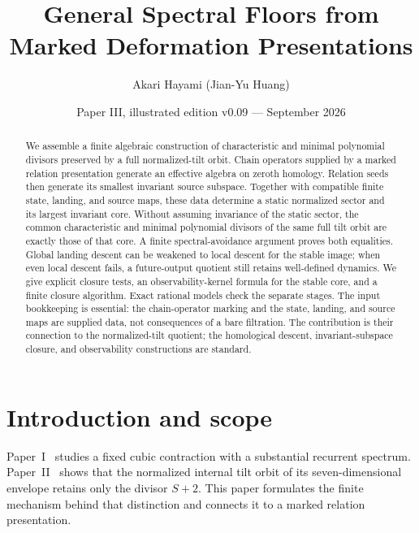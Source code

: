 \documentclass[11pt]{amsart}
\title[General Spectral Floors]{General Spectral Floors from Marked Deformation Presentations}
\author{Akari Hayami (Jian-Yu Huang)}
\date{Paper III, illustrated edition v0.09 --- September 2026}
\theoremstyle{definition}
\begin{document}
\begin{abstract}
We assemble a finite algebraic construction of characteristic and minimal polynomial
divisors preserved by a full normalized-tilt orbit. Chain operators supplied by a marked
relation presentation generate an effective algebra on zeroth homology. Relation seeds
then generate its smallest invariant source subspace. Together with compatible finite
state, landing, and source maps, these data determine a static normalized sector and its largest invariant core.
Without assuming invariance of the static sector, the common characteristic and minimal
polynomial divisors of the same full tilt orbit are exactly those of that core.
A finite spectral-avoidance argument proves both equalities.
Global landing descent can be weakened to local descent for the stable image;
when even local descent fails, a future-output quotient still retains well-defined dynamics.
We give explicit closure tests, an observability-kernel formula for the stable core,
and a finite closure algorithm. Exact rational models check the separate stages.
The input bookkeeping is essential: the chain-operator marking and the state,
landing, and source maps are supplied data, not consequences of a bare filtration.
The contribution is their connection to the normalized-tilt quotient; the homological
descent, invariant-subspace closure, and observability constructions are standard.
\end{abstract}
\maketitle

\tableofcontents

\section{Introduction and scope}

Paper~I~\cite{PaperI} studies a fixed cubic contraction with a substantial recurrent
spectrum. Paper~II~\cite{PaperII} shows that the normalized internal tilt orbit of its
seven-dimensional envelope retains only the divisor \(S+2\). This paper formulates
the finite mechanism behind that distinction and connects it to a marked relation
presentation.
\end{document}

